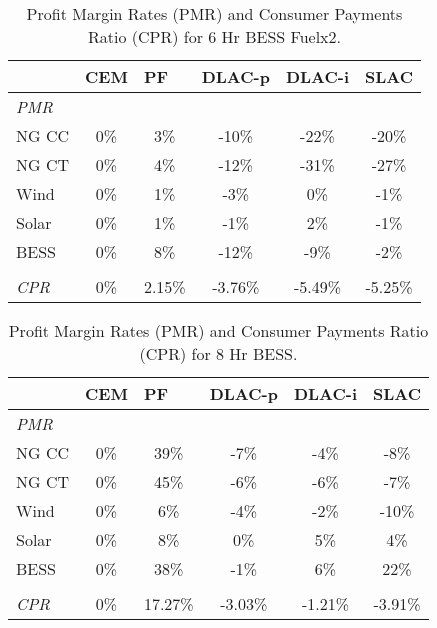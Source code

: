 \documentclass{article}
\begin{document}
\begin{table}[ht]
\centering
\begin{tabular}{lccccc}
\toprule
& \multicolumn{1}{l}{\textbf{CEM}} 
& \multicolumn{1}{l}{\textbf{PF}} 
& \multicolumn{1}{l}{\textbf{DLAC-p}} 
& \multicolumn{1}{l}{\textbf{DLAC-i}} 
& \multicolumn{1}{l}{\textbf{SLAC}} 
 \\ \hline
\midrule
\textit{PMR} & & & & \\
\quad NG CC & 0\% & 3\% & -10\% & -22\% & -20\% \\
\quad NG CT & 0\% & 4\% & -12\% & -31\% & -27\% \\
\quad Wind & 0\% & 1\% & -3\% & 0\% & -1\% \\
\quad Solar & 0\% & 1\% & -1\% & 2\% & -1\% \\
\quad BESS & 0\% & 8\% & -12\% & -9\% & -2\% \\
& & & & \\
\textit{CPR} & 0\% & 2.15\% & -3.76\% & -5.49\% & -5.25\% \\
\bottomrule
\end{tabular}
\caption{Profit Margin Rates (PMR) and Consumer Payments Ratio (CPR) for 6 Hr BESS Fuelx2.}
\label{table:6_Hr_BESS_Fuelx2_pmr}
\end{table}

\begin{table}[ht]
\centering
\begin{tabular}{lccccc}
\toprule
& \multicolumn{1}{l}{\textbf{CEM}} 
& \multicolumn{1}{l}{\textbf{PF}} 
& \multicolumn{1}{l}{\textbf{DLAC-p}} 
& \multicolumn{1}{l}{\textbf{DLAC-i}} 
& \multicolumn{1}{l}{\textbf{SLAC}} 
 \\ \hline
\midrule
\textit{PMR} & & & & \\
\quad NG CC & 0\% & 39\% & -7\% & -4\% & -8\% \\
\quad NG CT & 0\% & 45\% & -6\% & -6\% & -7\% \\
\quad Wind & 0\% & 6\% & -4\% & -2\% & -10\% \\
\quad Solar & 0\% & 8\% & 0\% & 5\% & 4\% \\
\quad BESS & 0\% & 38\% & -1\% & 6\% & 22\% \\
& & & & \\
\textit{CPR} & 0\% & 17.27\% & -3.03\% & -1.21\% & -3.91\% \\
\bottomrule
\end{tabular}
\caption{Profit Margin Rates (PMR) and Consumer Payments Ratio (CPR) for 8 Hr BESS.}
\label{table:8_Hr_BESS_pmr}
\end{table}
\end{document}
